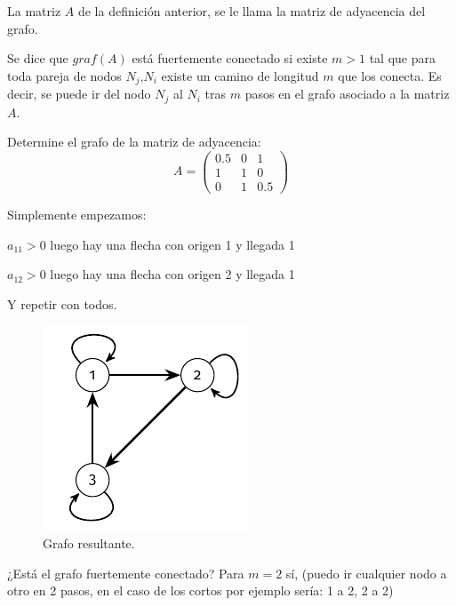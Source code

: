 \begin{ndef}
	La matriz $A$ de la definición anterior, se le llama la matriz de adyacencia del grafo.
\end{ndef}

\begin{ndef}
	Se dice que $graf(A)$ está fuertemente conectado si existe $m>1$ tal que para toda pareja de nodos $N_{j}$,$N_{i}$ existe un camino de longitud $m$ que los conecta. Es decir, se puede ir del nodo $N_{j}$ al $N_{i}$ tras $m$ pasos en el grafo asociado a la matriz $A$.
\end{ndef}

\begin{ejemplo}
Determine el grafo de la matriz de adyacencia:
$$A=
\begin{pmatrix}
0.5 & 0 & 1 \\
1 & 1 & 0 \\
0 & 1 & 0.5
\end{pmatrix}
$$

Simplemente empezamos:

$a_{11}>0$ luego hay una flecha con origen 1 y llegada 1

$a_{12}>0$ luego hay una flecha con origen 2 y llegada 1

Y repetir con todos.
\begin{figure}[H]
	\caption{Grafo resultante.}
	\centering \includegraphics{./img/grafo_1.pdf}
\end{figure}

¿Está el grafo fuertemente conectado? Para $m=2$ sí, (puedo ir cualquier nodo a otro en 2 pasos, en el caso de los cortos por ejemplo sería: 1 a 2, 2 a 2)
\end{ejemplo}

